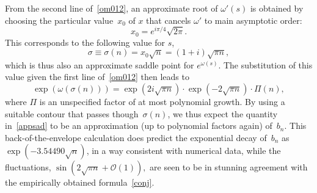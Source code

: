 \documentclass{amsart}
\newtheorem{theorem}{Theorem}
\begin{document}
From the second line of~\eqref{om012}, an approximate root of $\omega'(s)$
is obtained by choosing the particular value~$x_0$ of $x$ that cancels 
$\omega'$ to main asymptotic order:
\begin{equation}\label{x0}
x_0=e^{i\pi/4}\sqrt{2\pi}.
\end{equation}
This corresponds to the following value for $s$,
\begin{equation}\label{sad0}
\sigma\equiv \sigma(n)= x_0\sqrt{n} = %
(1+i)\sqrt{\pi n},
\end{equation}
which is thus also an approximate saddle point for $e^{\omega(s)}$.
The substitution of this value given the first line of~\eqref{om012} then leads to
\begin{equation}\label{appsad}
\exp\left(\omega(\sigma(n))\right)
=\exp\left(2i\sqrt{\pi n}\right) \cdot \exp\left(-2\sqrt{\pi n}\right)\cdot \Pi(n),
\end{equation}
where $\Pi$ is an
unspecified factor of at most polynomial growth. 
By using a suitable contour that passes though~$\sigma(n)$,
we thus expect the quantity in~\eqref{appsad} to be an approximation
(up to polynomial factors again) of~$b_n$. This back-of-the-envelope calculation
does predict  the exponential decay of~$b_n$ as $\exp\left(-3.54490\sqrt{n}\right)$,
in a way consistent with numerical data, while 
the fluctuations,
$
\sin\left(2\sqrt{\pi n}+\mathcal{O}(1)\right),
$
are seen to be in stunning agreement with the empirically obtained formula~\eqref{conj}.

% 
\end{document}
